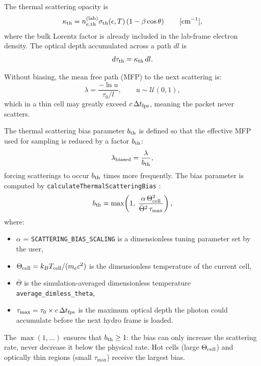 \documentclass[12pt,a4paper]{article}
\newcommand{\code}[1]{\texttt{#1}}
\newcommand{\raikou}{\textsc{Raikou}}
\begin{document}
The thermal scattering opacity is
\begin{equation}
	\kappa_{\rm th}
	=
	n_{e,\mathrm{th}}^{(\mathrm{lab})}
	\sigma_{\rm th}(\epsilon,T)
	\left(1-\beta\cos\theta\right)
	\qquad
	[\mathrm{cm^{-1}}],
	\label{eq:chi_thermal}
\end{equation}
where the bulk Lorentz factor is already included in the lab-frame
electron density. The optical depth accumulated across a path $dl$ is
\begin{equation}
	d\tau_{\rm th}
	=
	\kappa_{\rm th}\,dl.
\end{equation}

Without biasing, the mean free path (MFP) to the next scattering is:
\begin{equation}
	\lambda = \frac{-\ln u}{\tau_0/l}, \qquad u \sim \mathcal{U}(0,1),
	\label{eq:mfp_unbiased}
\end{equation}
which in a thin cell may greatly exceed $c\,\Delta t_{\rm fps}$, meaning
the packet never scatters.

The thermal scattering bias parameter $b_{\rm th}$ is defined so that
the effective MFP used for sampling is reduced by a factor $b_{\rm th}$:
\begin{equation}
	\lambda_{\rm biased} = \frac{\lambda}{b_{\rm th}},
	\label{eq:mfp_biased}
\end{equation}
forcing scatterings to occur $b_{\rm th}$ times more frequently.
The bias parameter is computed by \code{calculateThermalScatteringBias}
\citep[\raikou{} Eq.~37]{kawashima2023}:
\begin{equation}
	b_{\rm th} = \max\!\left(1,\;
	\frac{\alpha\,\Theta_{\rm cell}^2}
	{\bar{\Theta}^2\,\tau_{\max}}
	\right),
	\label{eq:thermal_bias}
\end{equation}
where:
\begin{itemize}
	\item $\alpha$ = \code{SCATTERING\_BIAS\_SCALING} is a dimensionless
	tuning parameter set by the user,
	\item $\Theta_{\rm cell} = k_B T_{\rm cell}/(m_e c^2)$ is the
	dimensionless temperature of the current cell,
	\item $\bar{\Theta}$ is the simulation-averaged dimensionless
	temperature \code{average\_dimless\_theta},
	\item $\tau_{\max} = \tau_0 \times c\,\Delta t_{\rm fps}$ is the
	maximum optical depth the photon could accumulate before the next
	hydro frame is loaded.
\end{itemize}
The $\max(1,\ldots)$ ensures that $b_{\rm th} \ge 1$: the bias can only
increase the scattering rate, never decrease it below the physical rate.
Hot cells (large $\Theta_{\rm cell}$) and optically thin regions (small
$\tau_{\max}$) receive the largest bias.
\end{document}
